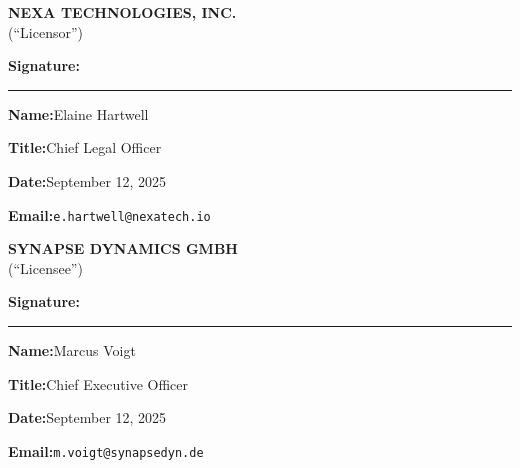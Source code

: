 \documentclass[11pt,a4paper]{article}
\begin{document}
\noindent
\begin{minipage}[t]{0.46\textwidth}
\begin{tcolorbox}[
  enhanced,
  colback=NexaLight,
  colframe=NexaNavy,
  boxrule=0.8pt,
  arc=3pt,
  left=10pt, right=10pt, top=10pt, bottom=10pt
]
  {\small\bfseries\color{NexaNavy}NEXA TECHNOLOGIES, INC.}\\[2pt]
  {\small\color{NexaMuted}(``Licensor'')}

  \vspace{14pt}
  \textbf{Signature:}\enspace\rule{0.55\textwidth}{0.4pt}

  \vspace{10pt}
  \textbf{Name:}\enspace Elaine Hartwell

  \vspace{6pt}
  \textbf{Title:}\enspace Chief Legal Officer

  \vspace{6pt}
  \textbf{Date:}\enspace September 12, 2025

  \vspace{6pt}
  \textbf{Email:}\enspace \texttt{e.hartwell@nexatech.io}
\end{tcolorbox}
\end{minipage}%
\hfill
\begin{minipage}[t]{0.46\textwidth}
\begin{tcolorbox}[
  enhanced,
  colback=NexaLight,
  colframe=NexaSlate,
  boxrule=0.8pt,
  arc=3pt,
  left=10pt, right=10pt, top=10pt, bottom=10pt
]
  {\small\bfseries\color{NexaNavy}SYNAPSE DYNAMICS GMBH}\\[2pt]
  {\small\color{NexaMuted}(``Licensee'')}

  \vspace{14pt}
  \textbf{Signature:}\enspace\rule{0.55\textwidth}{0.4pt}

  \vspace{10pt}
  \textbf{Name:}\enspace Marcus Voigt

  \vspace{6pt}
  \textbf{Title:}\enspace Chief Executive Officer

  \vspace{6pt}
  \textbf{Date:}\enspace September 12, 2025

  \vspace{6pt}
  \textbf{Email:}\enspace \texttt{m.voigt@synapsedyn.de}
\end{tcolorbox}
\end{minipage}

\newpage
\end{document}

